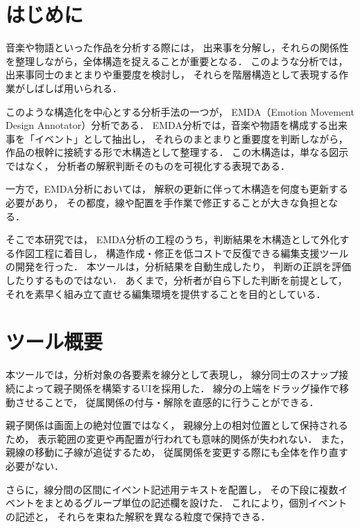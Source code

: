 

\section{はじめに}
音楽や物語といった作品を分析する際には，
出来事を分解し，それらの関係性を整理しながら，全体構造を捉えることが重要となる．
このような分析では，出来事同士のまとまりや重要度を検討し，
それらを階層構造として表現する作業がしばしば用いられる．

このような構造化を中心とする分析手法の一つが，
EMDA（Emotion Movement Design Annotator）分析である\cite{emda2019rigolo}．
EMDA分析では，音楽や物語を構成する出来事を「イベント」として抽出し，
それらのまとまりと重要度を判断しながら，
作品の根幹に接続する形で木構造として整理する．
この木構造は，単なる図示ではなく，
分析者の解釈判断そのものを可視化する表現である．

一方で，EMDA分析においては，
解釈の更新に伴って木構造を何度も更新する必要があり，
その都度，線や配置を手作業で修正することが大きな負担となる．

そこで本研究では，
EMDA分析の工程のうち，判断結果を木構造として外化する作図工程に着目し，
構造作成・修正を低コストで反復できる編集支援ツールの開発を行った．
本ツールは，分析結果を自動生成したり，
判断の正誤を評価したりするものではない．
あくまで，分析者が自ら下した判断を前提として，
それを素早く組み立て直せる編集環境を提供することを目的としている．

\section{ツール概要}
本ツールでは，分析対象の各要素を線分として表現し，
線分同士のスナップ接続によって親子関係を構築するUIを採用した．
線分の上端をドラッグ操作で移動させることで，
従属関係の付与・解除を直感的に行うことができる．

親子関係は画面上の絶対位置ではなく，
親線分上の相対位置として保持されるため，
表示範囲の変更や再配置が行われても意味的関係が失われない．
また，親線の移動に子線が追従するため，
従属関係を変更する際にも全体を作り直す必要がない．

さらに，線分間の区間にイベント記述用テキストを配置し，
その下段に複数イベントをまとめるグループ単位の記述欄を設けた．
これにより，個別イベントの記述と，
それらを束ねた解釈を異なる粒度で保持できる．

